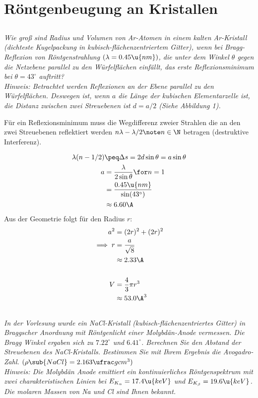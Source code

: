 \documentclass[ex,minted,hatbasis]{exercise_4.0}
\begin{document}
\section{Röntgenbeugung an Kristallen}
\subsection{}
{\it
Wie groß sind Radius und Volumen von {\normalfont Ar}-Atomen in einem kalten {\normalfont Ar}-Kristall (dichteste Kugelpackung in kubisch-flächenzentriertem Gitter), wenn bei Bragg-Reflexion von Röntgenstrahlung $(\lambda = 0.45 \u{nm})$, die unter dem Winkel $\theta$ gegen die Netzebene parallel zu den Würfelflächen einfällt, das erste Reflexionsminimum bei $\theta = 43^\circ$ auftritt?\\[1ex]
{Hinweis:} Betrachtet werden Reflexionen an der Ebene parallel zu den Würfelflächen. Deswegen ist, wenn $a$ die Länge der kubischen Elementarzelle ist, die Distanz zwischen zwei Streuebenen ist $d = a/2$ (Siehe Abbildung 1).}\vspace{2ex}

Für ein Reflexionsminimum muss die Wegdifferenz zweier Strahlen die an den zwei Streuebenen reflektiert werden $n\lambda-\lambda/2 \note n\in\N$ betragen (destruktive Interferenz).

\begin{align*}
    \lambda(n - 1/2) &\peq \Delta s = 2 d \sin\theta = a \sin\theta \\
    a &= \frac{\lambda}{2\sin\theta} \for n=1\\
    &= \frac{0.45\u{nm}}{\sin(43^\circ)}\\
    &\approx 6.60 \A 
\end{align*}
Aus der Geometrie folgt für den Radius $r$:
\begin{align*}
    a^2 &= (2r)^2 + (2r)^2\\ 
    \implies r &= \frac{a}{\sqrt 8}\\
    &\approx 2.33 \A\\
    \\
    V &= \frac 43 \pi r^3\\
    &\approx 53.0\A^3
\end{align*}

\subsection{}
\textit{In der Vorlesung wurde ein {\normalfont NaCl}-Kristall (kubisch-flächenzentriertes Gitter) in Braggscher Anordnung mit Röntgenlicht einer Molybdän-Anode vermessen. Die Bragg Winkel ergaben sich zu $7.22^\circ$ und $6.41^\circ$.
Berechnen Sie den Abstand der Streuebenen des {\normalfont NaCl}-Kristalls. Bestimmen Sie mit Ihrem Ergebnis die
Avogadro-Zahl. $(\rho\sub{NaCl} = 2.163 \ufrac g{cm^3})$\\[1ex]
{Hinweis:} Die Molybdän Anode emittiert ein kontinuierliches Röntgenspektrum mit zwei charakteristischen Linien bei $E_{K_\alpha} = 17.4 \u{keV}$ und $E_{K_\beta} = 19.6 \u{keV}$. Die molaren Massen von {\normalfont Na} und {\normalfont Cl} sind Ihnen
bekannt.}\vspace{2ex}
\end{document}
